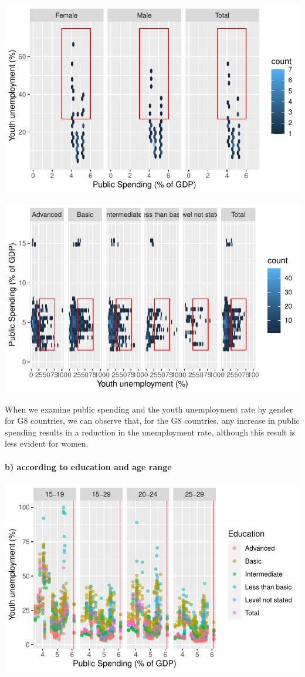 \documentclass[
  letterpaper,
  DIV=11,
  numbers=noendperiod]{scrartcl}
\let\oldparagraph\paragraph
\renewcommand{\paragraph}[1]{\oldparagraph{#1}\mbox{}}
\begin{document}
\includegraphics{Projet-BM_files/figure-pdf/unnamed-chunk-25-1.pdf}

\includegraphics{Projet-BM_files/figure-pdf/unnamed-chunk-25-2.pdf}

When we examine public spending and the youth unemployment rate by
gender for G8 countries, we can observe that, for the G8 countries, any
increase in public spending results in a reduction in the unemployment
rate, although this result is less evident for women.

\hypertarget{b-according-to-education-and-age-range}{%
\paragraph{b) according to education and age
range}\label{b-according-to-education-and-age-range}}

\includegraphics{Projet-BM_files/figure-pdf/unnamed-chunk-26-1.pdf}
\end{document}

